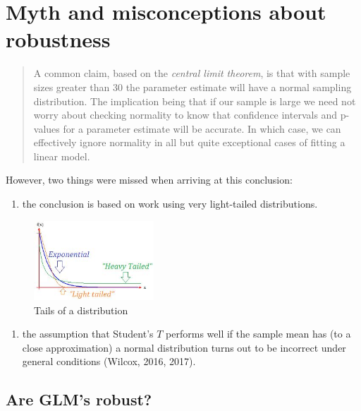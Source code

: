 \documentclass[
]{article}
\providecommand{\tightlist}{%
  \setlength{\itemsep}{0pt}\setlength{\parskip}{0pt}}
\begin{document}
\section*{Myth and misconceptions about robustness}\label{myth-and-misconceptions-about-robustness}

\begin{quote}
A common claim, based on the \emph{central limit theorem}, is that with sample sizes greater than 30 the parameter estimate will have a normal sampling distribution. The implication being that if our sample is large we need not worry about checking normality to know that confidence intervals and p-values for a parameter estimate will be accurate. In which case, we can effectively ignore normality in all but quite exceptional cases of fitting a linear model.
\end{quote}

However, two things were missed when arriving at this conclusion:

\begin{enumerate}
\def\labelenumi{\arabic{enumi}.}
\tightlist
\item
  the conclusion is based on work using very light-tailed distributions.
\end{enumerate}

\begin{figure}
\centering
\includegraphics[width=0.4\textwidth,height=\textheight]{Images/LightHeavyDistribution.JPG}
\caption{Tails of a distribution}
\end{figure}

\begin{enumerate}
\def\labelenumi{\arabic{enumi}.}
\setcounter{enumi}{1}
\tightlist
\item
  the assumption that Student's \(T\) performs well if the sample mean has (to a close approximation) a normal distribution turns out to be incorrect under general conditions (Wilcox, 2016, 2017).
\end{enumerate}

\subsection*{Are GLM's robust?}\label{are-glms-robust}
\end{document}
